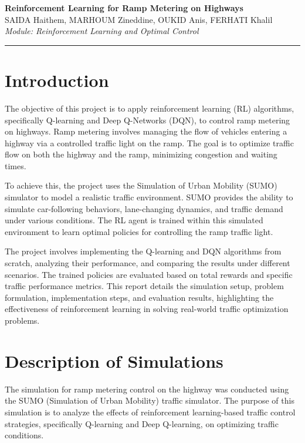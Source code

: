 \documentclass[a4paper, 12pt]{article}
\begin{document}
\begin{center}
\Large{\textbf{Reinforcement Learning for Ramp Metering on Highways}} 
\\
\vspace{0.4cm}
\normalsize
SAIDA Haithem, MARHOUM Zineddine, OUKID Anis, FERHATI Khalil \\
\vspace{0.2cm}
\textit{Module: Reinforcement Learning and Optimal Control}
\medskip
\normalsize
\end{center}

\hrule
\vspace{0.4cm}

\tableofcontents
\newpage

\section{Introduction}
The objective of this project is to apply reinforcement learning (RL) algorithms, specifically Q-learning and Deep Q-Networks (DQN), to control ramp metering on highways. Ramp metering involves managing the flow of vehicles entering a highway via a controlled traffic light on the ramp. The goal is to optimize traffic flow on both the highway and the ramp, minimizing congestion and waiting times.

To achieve this, the project uses the Simulation of Urban Mobility (SUMO) simulator to model a realistic traffic environment. SUMO provides the ability to simulate car-following behaviors, lane-changing dynamics, and traffic demand under various conditions. The RL agent is trained within this simulated environment to learn optimal policies for controlling the ramp traffic light.

The project involves implementing the Q-learning and DQN algorithms from scratch, analyzing their performance, and comparing the results under different scenarios. The trained policies are evaluated based on total rewards and specific traffic performance metrics. This report details the simulation setup, problem formulation, implementation steps, and evaluation results, highlighting the effectiveness of reinforcement learning in solving real-world traffic optimization problems.

\section{Description of Simulations}
The simulation for ramp metering control on the highway was conducted using the SUMO (Simulation of Urban Mobility) traffic simulator. The purpose of this simulation is to analyze the effects of reinforcement learning-based traffic control strategies, specifically Q-learning and Deep Q-learning, on optimizing traffic conditions.
\end{document}
